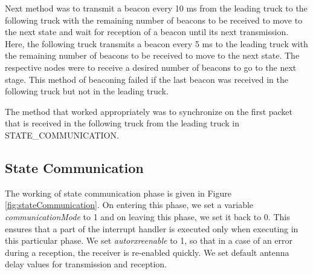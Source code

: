 Next method was to transmit a beacon every 10 ms from the leading truck to the following truck with the remaining number of beacons to be received to move to the next state and wait for reception of a beacon until its next transmission. Here, the following truck transmits a beacon every 5 ms to the leading truck with the remaining number of beacons to be received to move to the next state. The respective nodes were to receive a desired number of beacons to go to the next stage. This method of beaconing failed if the last beacon was received in the following truck but not in the leading truck.

The method that worked appropriately was to synchronize on the first packet that is received in the following truck from the leading truck in STATE\_COMMUNICATION. 

\subsection{State Communication}
The working of state communication phase is given in Figure \ref{fig:stateCommunication}. On entering this phase, we set a variable \emph{communicationMode} to 1 and on leaving this phase, we set it back to 0. This ensures that a part of the interrupt handler is executed only when executing in this particular phase. We set \emph{autorxreenable} to 1, so that in a case of an error during a reception, the receiver is re-enabled quickly. We set default antenna delay values for transmission and reception. 

